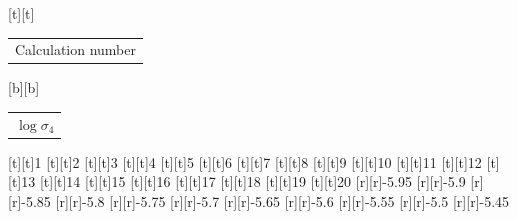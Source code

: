 %    
%
%
\begin{psfrags}%
\psfragscanon%
%
[t][t]{\color[rgb]{0,0,0}\setlength{\tabcolsep}{0pt}\begin{tabular}{c}{\Large{}Calculation number}\end{tabular}}%
[b][b]{\color[rgb]{0,0,0}\setlength{\tabcolsep}{0pt}\begin{tabular}{c}{\Large$\log \sigma_4$}\end{tabular}}%
%
[t][t]{1}%
[t][t]{2}%
[t][t]{3}%
[t][t]{4}%
[t][t]{5}%
[t][t]{6}%
[t][t]{7}%
[t][t]{8}%
[t][t]{9}%
[t][t]{10}%
[t][t]{11}%
[t][t]{12}%
[t][t]{13}%
[t][t]{14}%
[t][t]{15}%
[t][t]{16}%
[t][t]{17}%
[t][t]{18}%
[t][t]{19}%
[t][t]{20}%
%
[r][r]{-5.95}%
[r][r]{-5.9}%
[r][r]{-5.85}%
[r][r]{-5.8}%
[r][r]{-5.75}%
[r][r]{-5.7}%
[r][r]{-5.65}%
[r][r]{-5.6}%
[r][r]{-5.55}%
[r][r]{-5.5}%
[r][r]{-5.45}%
%
%
\end{psfrags}%
%
